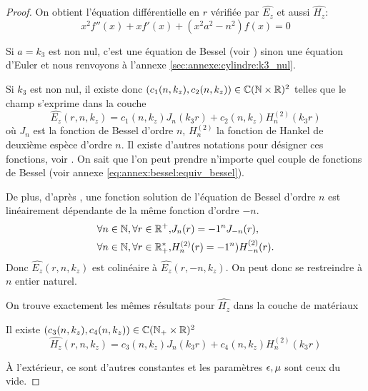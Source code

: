 \begin{proof}
    On obtient l'équation différentielle en \(r\) vérifiée par \(\hat{E_z}\) et aussi \(\hat{H_z}\):
    \begin{equation*}
      x^2 f''(x) + xf'(x) + \left(x^2a^2 - n^2\right)f(x) = 0
    \end{equation*}

    Si \(a = k_3\) est non nul, c'est une équation de Bessel (voir \cite[eq (6.80)]{bowman_introduction_1958}) sinon une équation d'Euler et nous renvoyons à l'annexe \ref{sec:annexe:cylindre:k3_nul}.

    Si \(k_3\) est non nul, il existe donc \((c_1(n,k_z),c_2(n,k_z)) \in \mathbb C(\mathbb N\times\mathbb R)^2\) telles que le champ s'exprime dans la couche
    \begin{equation*}
          \hat{E_z}(r,n,k_z) = c_1(n,k_z) J_n\left(k_3r\right) + c_2(n,k_z) H_n^{(2)}\left(k_3r\right)
    \end{equation*}
    où \(J_n\) est la fonction de Bessel d'ordre \(n\), \(H_n^{(2)}\) la fonction de Hankel de deuxième espèce d'ordre \(n\). Il existe d'autres notations pour désigner ces fonctions,  voir \cite[p.~358]{abramowitz_handbook_1964}.
    On sait que l'on peut prendre n'importe quel couple de fonctions de Bessel (voir annexe \eqref{eq:annex:bessel:equiv_bessel}).

    De plus, d'après \cite[p.~358]{abramowitz_handbook_1964}, une fonction solution de l'équation de Bessel d'ordre \(n\) est linéairement dépendante de la même fonction d'ordre \(-n\).
    \begin{align*}
       \forall n \in \mathbb N, \forall r \in \mathbb R^+,& J_n(r) = -1^nJ_{-n}(r),
       \\
       \forall n \in \mathbb N, \forall r \in \mathbb R_+^*,& H_n^{(2)}(r) = -1^n)H_{-n}^{(2)}(r).
    \end{align*}
    Donc  \(\hat{E_z}(r,n,k_z)\) est colinéaire à  \(\hat{E_z}(r,-n,k_z)\).
    On peut donc se restreindre à \(n\) entier naturel.

    On trouve exactement les mêmes résultats pour \(\hat{H_z}\) dans la couche de matériaux

    Il existe \((c_3(n,k_z),c_4(n,k_z)) \in \mathbb C(\mathbb N_+\times\mathbb R)^2\)
    \begin{equation*}
      \hat{H_z}(r,n,k_z) = c_3(n,k_z) J_n\left(k_3r\right) + c_4(n,k_z) H_n^{(2)}\left(k_3r\right)
    \end{equation*}

    À l'extérieur, ce sont d'autres constantes et les paramètres \(\epsilon,\mu\) sont ceux du vide. 
  \end{proof}

